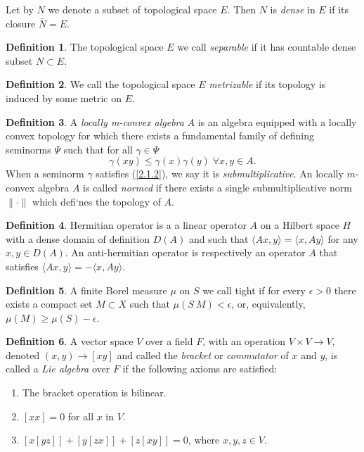 \documentclass[12pt,a4paper]{report}
\theoremstyle{definition}
\newtheorem{definition}{Definition}
\begin{document}
\begin{appendix}
Let by $N$ we denote a subset of topological space $E$. Then $N$ is \textit{dense} in $E$ if its closure $\bar{N}=E$.

\begin{definition}
	The topological space $E$ we call \textit{separable} if it has countable dense subset $N\subset E$. 
\end{definition}

\begin{definition}
	We call the topological space $E$ \textit{metrizable} if its topology is induced by some metric on $E$.
\end{definition}



\begin{definition}\parencite[see][]{chevyrev2015characteristic}
	A \textit{locally m-convex algebra} $A$ is an algebra equipped with a locally convex topology for which there exists a fundamental family of defining seminorms $\Psi$ such that for all $\gamma \in \Psi$
	\begin{equation}\label{2.1.2}
		\gamma(xy) \leq \gamma(x)\gamma(y)\; \forall x, y \in A.
	\end{equation}
	When a seminorm $\gamma$ satisfies (\ref{2.1.2}), we say it is \textit{submultiplicative}. An locally $m$-convex algebra $ A$ is called \textit{normed} if there exists a single submultiplicative norm $\|\cdot \|$ which defi`nes the topology of $A$.
\end{definition}


\begin{definition}\parencite{akhiezer1981theory}
	Hermitian operator is a a linear operator $A$ on a Hilbert space $H$ with a dense domain of definition $D(A)$ and such that $⟨Ax,y⟩=⟨x,Ay⟩$ for any $x,y\in D(A)$. An anti-hermitian operator is respectively an operator $A$ that satisfies $⟨Ax,y⟩=-⟨x,Ay⟩$.
\end{definition}

\begin{definition}\parencite{billingsley1968convergence}
	A finite Borel measure $\mu$ on $S$ we call tight if for every $\epsilon > 0$ there exists a compact set $M \subset X$ such that $\mu(S \ M) < \epsilon$, or, equivalently, $\mu(M) \geq \mu(S)-\epsilon$.
\end{definition}

\begin{definition}
	A vector space $V$ over a field $F$, with an operation $V\times V \rightarrow V$, denoted $(x, y) \rightarrow [xy]$ and called the \textit{bracket} or \textit{commutator} of $x$ and $y$, is called a \textit{Lie algebra} over $F$ if the following axioms are satisfied:
	\begin{enumerate}
		\item The bracket operation is bilinear.
		\item 	$[xx] = 0$ for all $x$ in $V$.
		\item $[x[yz]] + [y[zx]]+ [z[xy]] = 0$, where $x, y, z \in V.$ 
	\end{enumerate}
\end{definition}




\end{appendix}
\end{document}
